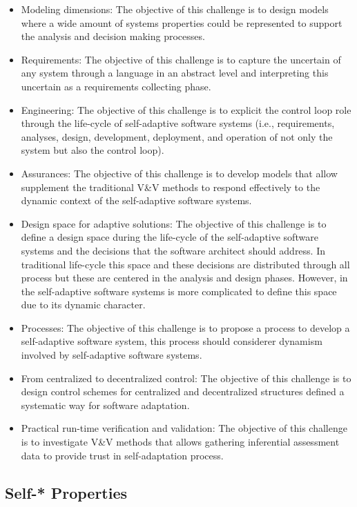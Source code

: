 \begin{itemize}
	\item Modeling dimensions: The objective of this challenge is to design models where a wide amount of systems properties could be represented to support the analysis and decision making processes.
	\item Requirements: The objective of this challenge is to capture the uncertain of any system through a language in an abstract level and interpreting this uncertain as a requirements collecting phase.
	\item Engineering: The objective of this challenge is to explicit the control loop role through the life-cycle of self-adaptive software systems (i.e., requirements, analyses, design, development, deployment, and operation of not only the system but also the control loop).
	\item Assurances: The objective of this challenge is to develop models that allow supplement the traditional V\&V methods to respond effectively to the dynamic context of the self-adaptive software systems.
	\item Design space for adaptive solutions: The objective of this challenge is to define a design space during the life-cycle of the self-adaptive software systems and the decisions that the software architect should address. In traditional life-cycle this space and these decisions are distributed through all process but these are centered in the analysis and design phases. However, in the self-adaptive software systems is more complicated to define this space due to its dynamic character.
	\item Processes: The objective of this challenge is to propose a process to develop a self-adaptive software system, this process should considerer dynamism involved by self-adaptive software systems.
	\item From centralized to decentralized control: The objective of this challenge is to design control schemes for centralized and decentralized structures defined a systematic way for software adaptation.
	\item Practical run-time verification and validation: The objective of this challenge is to investigate V\&V methods that allows gathering inferential assessment data to provide trust in self-adaptation process.
\end{itemize}

\subsection{Self-* Properties}

